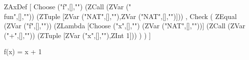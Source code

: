 ZAxDef
  [ Choose ("f",[],"")
           (ZCall (ZVar ("\\fun",[],"")) (ZTuple [ZVar ("NAT",[],""),ZVar ("NAT",[],"")]))
  , Check ( ZEqual
            (ZVar ("f",[],""))
            (ZLambda [Choose ("x",[],"") (ZVar ("NAT",[],""))]
                     (ZCall (ZVar ("+",[],""))
                            (ZTuple [ZVar ("x",[],""),ZInt 1]))
            )
           )
  ]


f(x) = x + 1
